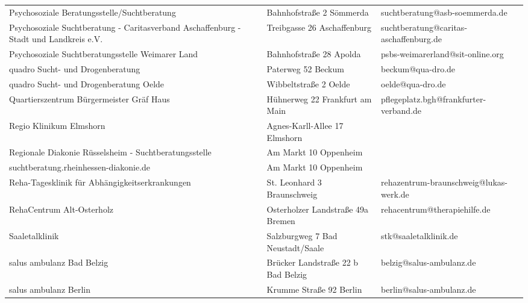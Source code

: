 {\begin{xltabular}{\textwidth} {
 >{\raggedright\arraybackslash}p{5cm}
 >{\raggedright\arraybackslash}X
 >{\raggedright\arraybackslash}p{5cm} }
Psychosoziale Beratungsstelle/Suchtberatung & Bahnhofstraße 2 Sömmerda & suchtberatung@asb-soemmerda.de \\
Psychosoziale Suchtberatung - Caritasverband Aschaffenburg - Stadt und Landkreis e.V. & Treibgasse 26 Aschaffenburg & suchtberatung@caritas-aschaffenburg.de \\
Psychosoziale Suchtberatungsstelle Weimarer Land & Bahnhofstraße 28 Apolda & psbs-weimarerland@sit-online.org \\
quadro Sucht- und Drogenberatung & Paterweg 52 Beckum & beckum@qua-dro.de \\
quadro Sucht- und Drogenberatung Oelde & Wibbeltstraße 2 Oelde & oelde@qua-dro.de \\
Quartierszentrum Bürgermeister Gräf Haus & Hühnerweg 22 Frankfurt am Main & pflegeplatz.bgh@frankfurter-verband.de \\
Regio Klinikum Elmshorn & Agnes-Karll-Allee 17 Elmshorn &  \\
Regionale Diakonie Rüsselsheim - Suchtberatungsstelle & Am Markt 10 Oppenheim &  \\
suchtberatung.rheinhessen-diakonie.de & Am Markt 10 Oppenheim &  \\
Reha-Tagesklinik für Abhängigkeitserkrankungen & St. Leonhard 3 Braunschweig & rehazentrum-braunschweig@lukas-werk.de \\
RehaCentrum Alt-Osterholz & Osterholzer Landstraße 49a Bremen & rehacentrum@therapiehilfe.de \\
Saaletalklinik & Salzburgweg 7 Bad Neustadt/Saale & stk@saaletalklinik.de \\
salus ambulanz Bad Belzig & Brücker Landstraße 22 b Bad Belzig & belzig@salus-ambulanz.de \\
salus ambulanz Berlin & Krumme Straße 92 Berlin & berlin@salus-ambulanz.de \\

\end{xltabular}}
